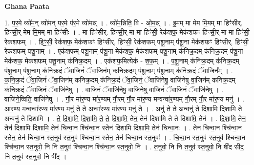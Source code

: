 \documentclass[17pt]{extarticle}
\begin{document}
\textbf{Ghana Paata } \newline

1. प॒र॒मे व्यो॑म॒न् व्यो॑मन् पर॒मे प॑र॒मे व्यो॑मन्न् । . व्यो॑म॒न्निति॒ वि - ओ॒म॒न्न् । . इ॒मम् मा मेम मि॒मम् मा हिꣳ॑सीर्. हिꣳसी॒र् मेम मि॒मम् मा हिꣳ॑सीः । . मा हिꣳ॑सीर्. हिꣳसी॒र् मा मा हिꣳ॑सी॒ रेक॑शफ॒ मेक॑शफꣳ हिꣳसी॒र् मा मा हिꣳ॑सी॒ रेक॑शफम् । . हिꣳ॒॒सी॒ रेक॑शफ॒ मेक॑शफꣳ हिꣳसीर्. हिꣳसी॒ रेक॑शफम् पशू॒नाम् प॑शू॒ना मेक॑शफꣳ हिꣳसीर्. हिꣳसी॒ रेक॑शफम् पशू॒नाम् । . एक॑शफम् पशू॒नाम् प॑शू॒ना मेक॑शफ॒ मेक॑शफम् पशू॒नाम् क॑निक्र॒दम् क॑निक्र॒दम् प॑शू॒ना मेक॑शफ॒ मेक॑शफम् पशू॒नाम् क॑निक्र॒दम् । . एक॑शफ॒मित्येक॑ - श॒फ॒म् । . प॒शू॒नाम् क॑निक्र॒दम् क॑निक्र॒दम् प॑शू॒नाम् प॑शू॒नाम् क॑निक्र॒दं ॅवा॒जिनं॑ ॅवा॒जिन॑म् कनिक्र॒दम् प॑शू॒नाम् प॑शू॒नाम् क॑निक्र॒दं ॅवा॒जिन᳚म् । . क॒नि॒क्र॒दं ॅवा॒जिनं॑ ॅवा॒जिन॑म् कनिक्र॒दम् क॑निक्र॒दं ॅवा॒जिनं॒ ॅवाजि॑नेषु॒ वाजि॑नेषु वा॒जिन॑म् कनिक्र॒दम् क॑निक्र॒दं ॅवा॒जिनं॒ ॅवाजि॑नेषु । . वा॒जिनं॒ ॅवाजि॑नेषु॒ वाजि॑नेषु वा॒जिनं॑ ॅवा॒जिनं॒ ॅवाजि॑नेषु । . वाजि॑ने॒ष्विति॒ वाजि॑नेषु । . गौ॒र मा॑र॒ण्य मा॑र॒ण्यम् गौ॒रम् गौ॒र मा॑र॒ण्य मन्वन्वा॑र॒ण्यम् गौ॒रम् गौ॒र मा॑र॒ण्य मनु॑ । . आ॒र॒ण्य मन्वन्वा॑र॒ण्य मा॑र॒ण्य मनु॑ ते ते॒ अन्वा॑र॒ण्य मा॑र॒ण्य मनु॑ ते । . अनु॑ ते ते॒ अन्वनु॑ ते दिशामि दिशामि ते॒ अन्वनु॑ ते दिशामि । . ते॒ दि॒शा॒मि॒ दि॒शा॒मि॒ ते॒ ते॒ दि॒शा॒मि॒ तेन॒ तेन॑ दिशामि ते ते दिशामि॒ तेन॑ । . दि॒शा॒मि॒ तेन॒ तेन॑ दिशामि दिशामि॒ तेन॑ चिन्वा॒न श्चि॑न्वा॒न स्तेन॑ दिशामि दिशामि॒ तेन॑ चिन्वा॒नः । . तेन॑ चिन्वा॒न श्चि॑न्वा॒न स्तेन॒ तेन॑ चिन्वा॒न स्त॒नुव॑ स्त॒नुव॑ श्चिन्वा॒न स्तेन॒ तेन॑ चिन्वा॒न स्त॒नुवः॑ । . चि॒न्वा॒न स्त॒नुव॑ स्त॒नुव॑ श्चिन्वा॒न श्चि॑न्वा॒न स्त॒नुवो॒ नि नि त॒नुव॑ श्चिन्वा॒न श्चि॑न्वा॒न स्त॒नुवो॒ नि । . त॒नुवो॒ नि नि त॒नुव॑ स्त॒नुवो॒ नि षी॑द सीद॒ नि त॒नुव॑ स्त॒नुवो॒ नि षी॑द । \newline
\end{document}
